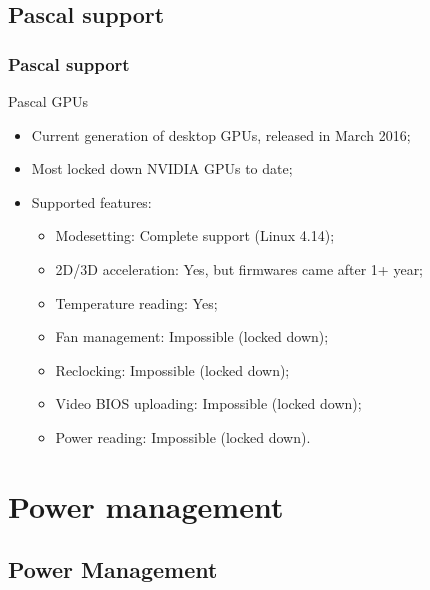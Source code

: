 \documentclass[11pt,english,compress]{beamer}
\begin{document}
\subsection*{Pascal support}
\begin{frame}
	\frametitle{Pascal support}

	\begin{block}{Pascal GPUs}
		\begin{itemize}
			\item Current generation of desktop GPUs, released in March 2016;
			\item Most locked down NVIDIA GPUs to date;
			\pause
			\item Supported features:
			\begin{itemize}
				\item Modesetting: Complete support (Linux 4.14);
				\item 2D/3D acceleration: Yes, but firmwares came after 1+ year;
				\item Temperature reading: Yes;
				\pause
				\item Fan management: Impossible (locked down);
				\item Reclocking: Impossible (locked down);
				\item Video BIOS uploading: Impossible (locked down);
				\item Power reading: Impossible (locked down).
			\end{itemize}
		\end{itemize}
	\end{block}
\end{frame}

\section{Power management}
\subsection*{Power Management}
\end{document}
